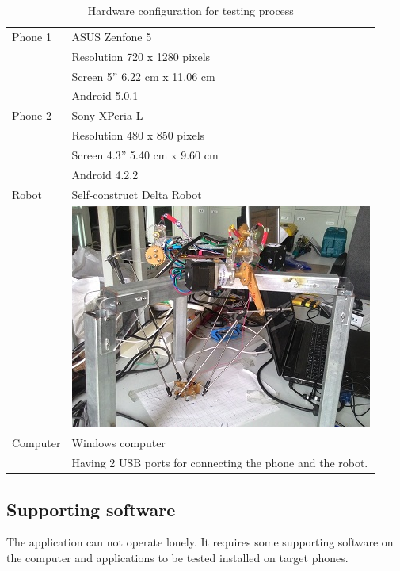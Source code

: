 \begin{table}[H]
	\centering
	\caption{Hardware configuration for testing process}	
	\label{tab:hw}
	\begin{tabularx}{0.65\textwidth}{ll}
		\toprule
		Phone 1 & ASUS Zenfone 5 \\
			  & Resolution 720 x 1280 pixels \\
			  & Screen 5'' 6.22 cm x 11.06 cm \\
			  & Android 5.0.1\\
		\midrule 
		Phone 2 & Sony XPeria L \\
			  & Resolution 480 x 850 pixels \\
			  & Screen 4.3'' 5.40 cm x 9.60 cm \\
			  & Android 4.2.2\\
		\midrule 
		Robot & Self-construct Delta Robot \\
			  & \begin{minipage}{0.7\linewidth}
			\includegraphics[width=0.8\linewidth]{Chapters/Fig/delta_robot.jpg}
		\end{minipage} \\
		\midrule 
		Computer & Windows computer \\
				 & Having 2 USB ports for connecting the phone and the robot. \\
		\bottomrule
	\end{tabularx}
\end{table}

\subsection{Supporting software}
The application can not operate lonely. It requires some supporting software on the computer and applications to be tested installed on target phones.

